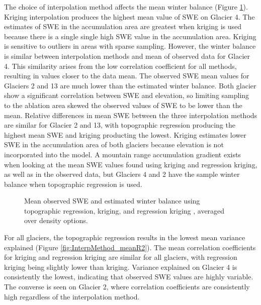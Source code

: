 \documentclass{sfuthesis}
\begin{document}
The choice of interpolation method affects the mean winter balance (Figure \ref{fig:InterpMethod_mean}). Kriging interpolation produces the highest mean value of SWE on Glacier 4. The estimates of SWE in the accumulation area are greatest when kriging is used because there is a single single high SWE value in the accumulation area. Kriging is sensitive to outliers in areas with sparse sampling. However, the winter balance is similar between interpolation methods and mean of observed data for Glacier 4. This similarity arises from the low correlation coefficient for all methods, resulting in values closer to the data mean. The observed SWE mean values for Glaciers 2 and 13 are much lower than the estimated winter balance. Both glacier show a significant correlation between SWE and elevation, so limiting sampling to the ablation area skewed the observed values of SWE to be lower than the mean. Relative differences in mean SWE between the three interpolation methods are similar for Glacier 2 and 13, with topographic regression producing the highest mean SWE and kriging producting the lowest. Kriging estimates lower SWE in the accumulation area of both glaciers because elevation is not incorporated into the model. A mountain range accumulation gradient exists when looking at the mean SWE values found using kriging and regression kriging, as well as in the observed data, but Glaciers 4 and 2 have the sample winter balance when topographic regression is used.

\begin{figure}
	\caption{Mean observed SWE and estimated winter balance using topographic regression, kriging, and regression kriging , averaged over density options.}
	\label{fig:InterpMethod_mean}
\end{figure}

For all glaciers, the topographic regression results in the lowest mean variance explained (Figure \ref{fig:InterpMethod_meanR2}). The mean correlation coefficients for kriging and regression kriging are similar for all glaciers, with regression kriging being slightly lower than kriging. Variance explained on Glacier 4 is consistently the lowest, indicating that observed SWE values are highly variable. The converse is seen on Glacier 2, where correlation coefficients are consistently high regardless of the interpolation method.
\end{document}
